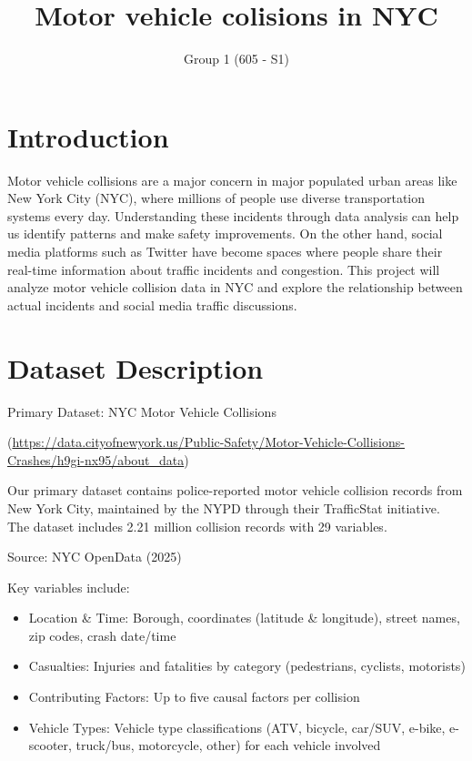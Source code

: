 \documentclass[10pt]{article}\usepackage[]{graphicx}\usepackage[]{xcolor}
\begin{document}
\title{Motor vehicle colisions in NYC}
\author{Group 1 (605 - S1)}
\maketitle
\tableofcontents

\newpage

\section{Introduction}

Motor vehicle collisions are a major concern in major populated urban areas like New York City (NYC), where millions of people use diverse transportation systems every day. Understanding these incidents through data analysis can help us identify patterns and make safety improvements. On the other hand, social media platforms such as Twitter have become spaces where people share their real-time information about traffic incidents and congestion. This project will analyze motor vehicle collision data in NYC and explore the relationship between actual incidents and social media traffic discussions. 

\section{Dataset Description}
Primary Dataset: NYC Motor Vehicle Collisions 

(\url{https://data.cityofnewyork.us/Public-Safety/Motor-Vehicle-Collisions-Crashes/h9gi-nx95/about_data})

Our primary dataset contains police-reported motor vehicle collision records from New York City, maintained by the NYPD through their TrafficStat initiative. The dataset includes 2.21 million collision records with 29 variables.

Source: NYC OpenData (2025)

Key variables include:
\begin{itemize}
  \item Location \& Time: Borough, coordinates (latitude \& longitude), street names, zip codes, crash date/time
  \item Casualties: Injuries and fatalities by category (pedestrians, cyclists, motorists)
  \item Contributing Factors: Up to five causal factors per collision
  \item Vehicle Types: Vehicle type classifications (ATV, bicycle, car/SUV, e-bike, e-scooter, truck/bus, motorcycle, other) for each vehicle involved
\end{itemize}
\end{document}
